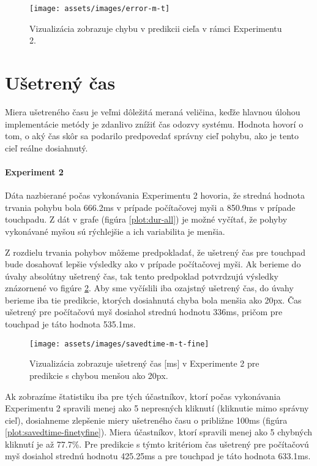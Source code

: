 \begin{figure}[h]
\centering
\texttt{[image: assets/images/error-m-t]}
\caption{Vizualizácia zobrazuje chybu v predikcii cieľa v rámci Experimentu 2.  \label{plot:error-m-t}}
\end{figure}

\section{Ušetrený čas}
Miera ušetreného času je veľmi dôležitá meraná veličina, keďže hlavnou úlohou implementácie metódy je zdanlivo znížiť čas odozvy systému. Hodnota hovorí o tom, o aký čas skôr sa podarilo predpovedať správny cieľ pohybu, ako je tento cieľ reálne dosiahnutý.

\paragraph{Experiment 2}
Dáta nazbierané počas vykonávania Experimentu 2 hovoria, že stredná hodnota trvania pohybu bola 666.2ms v prípade počítačovej myši a 850.9ms v prípade touchpadu. Z dát v grafe (figúra \ref{plot:dur-all}) je možné vyčítať, že pohyby vykonávané myšou sú rýchlejšie a ich variabilita je menšia.

Z rozdielu trvania pohybov môžeme predpokladať, že ušetrený čas pre touchpad bude dosahovať lepšie výsledky ako v prípade počítačovej myši. Ak berieme do úvahy absolútny ušetrený čas, tak tento predpoklad potvrdzujú výsledky znázornené vo figúre \ref{plot:savedtime-fine}. Aby sme vyčíslili iba ozajstný ušetrený čas, do úvahy berieme iba tie predikcie, ktorých dosiahnutá chyba bola menšia ako 20px. Čas ušetrený pre počítačovú myš dosiahol strednú hodnotu 336ms, pričom pre touchpad je táto hodnota 535.1ms. 

\begin{figure}[h]
\centering
\texttt{[image: assets/images/savedtime-m-t-fine]}
\caption{Vizualizácia zobrazuje ušetrený čas [ms] v Experimente 2 pre predikcie s chybou menšou ako 20px.  \label{plot:savedtime-fine}}
\end{figure}

Ak zobrazíme štatistiku iba pre tých účastníkov, ktorí počas vykonávania Experimentu 2 spravili menej ako 5 nepresných kliknutí (kliknutie mimo správny cieľ), dosiahneme zlepšenie miery ušetreného času o približne 100ms (figúra \ref{plot:savedtime-finetyfine}). Miera účastníkov, ktorí spravili menej ako 5 chybných kliknutí je až 77.7\%. Pre predikcie s týmto kritériom čas ušetrený pre počítačovú myš dosiahol strednú hodnotu 425.25ms a pre touchpad je táto hodnota 633.1ms. 

